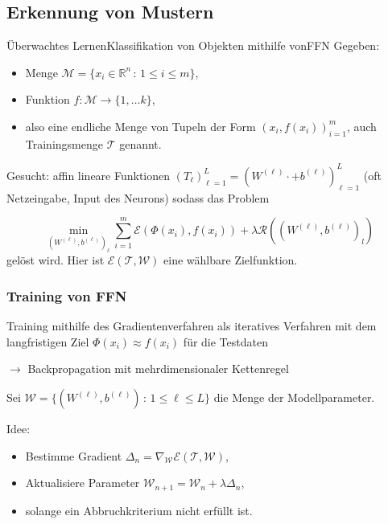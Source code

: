 \documentclass[10pt]{beamer} %
\newcommand{\RR}{\ensuremath{\mathbb{R}}}
\begin{document}
\subsection{Erkennung von Mustern}
\begin{frame}{Überwachtes Lernen}{Klassifikation von Objekten mithilfe vonFFN}
Gegeben: 
\begin{itemize}
   \item Menge $\mathcal{M}=\{x_i \in \RR^n \, : \, 1 \leq i \leq m\}$,
   \item Funktion $f: \mathcal{M} \rightarrow \{1, \ldots k\}$,
   \item also eine endliche Menge von Tupeln der Form $(x_i, f(x_i))_{i=1}^m$, auch Trainingsmenge $\mathcal{T}$ genannt.
\end{itemize} 
\pause
Gesucht: affin lineare Funktionen $(T_{\ell})_{\ell=1}^L=(W^{(\ell)} \cdot + b^{(\ell)})_{\ell=1}^L$ (oft Netzeingabe, Input des Neurons) sodass das Problem

\begin{equation*}
   \underset{(W^{(\ell)}, b^{(\ell)})_\ell}{\min} \sum_{i=1}^m \mathcal{E}(\Phi(x_i),f(x_i)) +\lambda \mathcal{R}((W^{(\ell)}, b^{(\ell)})_l)
\end{equation*}
gelöst wird. Hier ist $\mathcal{E}(\mathcal{T},\mathcal{W})$ eine wählbare Zielfunktion.
\end{frame}

\begin{frame}
   \frametitle{Training von FFN}
   Training mithilfe des Gradientenverfahren als iteratives Verfahren mit dem langfristigen Ziel $\Phi(x_i) \approx f(x_i)$ für die Testdaten 
   
   $\rightarrow$ Backpropagation mit mehrdimensionaler Kettenregel
   
   Sei $\mathcal{W}=\{(W^{(\ell)},b^{(\ell)}) \, : \, 1 \leq \ell \leq L\}$ die Menge der Modellparameter.

   Idee: 
   \begin{itemize}
      \pause
      \item Bestimme Gradient $\Delta_n=\nabla_{\mathcal{W}} \mathcal{E}(\mathcal{T},\mathcal{W})$,
      \pause
      \item Aktualisiere Parameter $\mathcal{W}_{n+1}= \mathcal{W}_n+ \lambda \Delta_n$,
      \pause
      \item solange ein Abbruchkriterium nicht erfüllt ist.
   \end{itemize} 

\end{frame}
\end{document}
